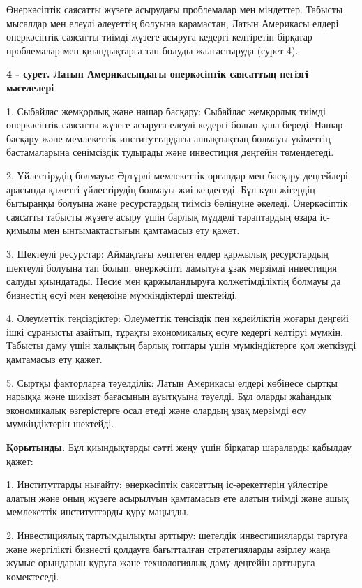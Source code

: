 \begin{multicols}{2}
Өнеркәсіптік саясатты жүзеге асырудағы проблемалар мен міндеттер.
Табысты мысалдар мен елеулі әлеуеттің болуына қарамастан, Латын
Америкасы елдері өнеркәсіптік саясатты тиімді жүзеге асыруға кедергі
келтіретін бірқатар проблемалар мен қиындықтарға тап болуды жалғастыруда
(сурет 4).
\end{multicols}

{\bfseries 4 - сурет. Латын Америкасындағы өнеркәсіптік саясаттың негізгі мәселелері}

\begin{multicols}{2}
1. Сыбайлас жемқорлық және нашар басқару: Сыбайлас жемқорлық тиімді
өнеркәсіптік саясатты жүзеге асыруға елеулі кедергі болып қала береді.
Нашар басқару және мемлекеттік институттардағы ашықтықтың болмауы
үкіметтің бастамаларына сенімсіздік тудырады және инвестиция деңгейін
төмендетеді.

2. Үйлестірудің болмауы: Әртүрлі мемлекеттік органдар мен басқару
деңгейлері арасында қажетті үйлестірудің болмауы жиі кездеседі. Бұл
күш-жігердің бытыраңқы болуына және ресурстардың тиімсіз бөлінуіне
әкеледі. Өнеркәсіптік саясатты табысты жүзеге асыру үшін барлық мүдделі
тараптардың өзара іс-қимылы мен ынтымақтастығын қамтамасыз ету қажет.

3. Шектеулі ресурстар: Аймақтағы көптеген елдер қаржылық ресурстардың
шектеулі болуына тап болып, өнеркәсіпті дамытуға ұзақ мерзімді
инвестиция салуды қиындатады. Несие мен қаржыландыруға қолжетімділіктің
болмауы да бизнестің өсуі мен кеңеюіне мүмкіндіктерді шектейді.

4. Әлеуметтік теңсіздіктер: Әлеуметтік теңсіздік пен кедейліктің жоғары
деңгейі ішкі сұранысты азайтып, тұрақты экономикалық өсуге кедергі
келтіруі мүмкін. Табысты даму үшін халықтың барлық топтары үшін
мүмкіндіктерге қол жеткізуді қамтамасыз ету қажет.

5. Сыртқы факторларға тәуелділік: Латын Америкасы елдері көбінесе сыртқы
нарыққа және шикізат бағасының ауытқуына тәуелді. Бұл оларды жаһандық
экономикалық өзгерістерге осал етеді және олардың ұзақ мерзімді өсу
мүмкіндіктерін шектейді.

{\bfseries Қорытынды.} Бұл қиындықтарды сәтті жеңу үшін бірқатар шараларды
қабылдау қажет:

1. Институттарды нығайту: өнеркәсіптік саясаттың іс-әрекеттерін
үйлестіре алатын және оның жүзеге асырылуын қамтамасыз ете алатын тиімді
және ашық мемлекеттік институттарды құру маңызды.

2. Инвестициялық тартымдылықты арттыру: шетелдік инвестицияларды тартуға
және жергілікті бизнесті қолдауға бағытталған стратегияларды әзірлеу
жаңа жұмыс орындарын құруға және технологиялық даму деңгейін арттыруға
көмектеседі.


\end{multicols}
